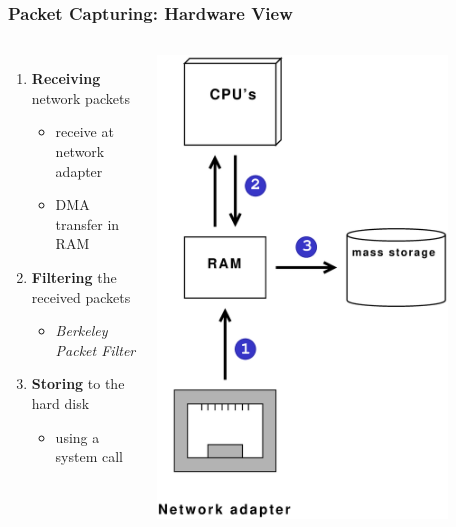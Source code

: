 \documentclass{beamer}
\begin{document}
\begin{frame}
\frametitle{Packet Capturing: Hardware View}
\begin{columns}
\vspace{-15em}
\begin{enumerate}
	\item \textbf{Receiving} network packets
		\begin{itemize}
			\item receive at network adapter
			\item DMA transfer in RAM \newline
		\end{itemize}
	\item \textbf{Filtering} the received packets 
		\begin{itemize}
			\item \emph{Berkeley Packet Filter}\newline
		\end{itemize}
	\item \textbf{Storing} to the hard disk
		\begin{itemize}
			\item using a system call
		\end{itemize}
\end{enumerate}
\includegraphics [width=0.82\textwidth, keepaspectratio]{pics/HardwareView}
\end{columns}
\end{frame}
\end{document}
